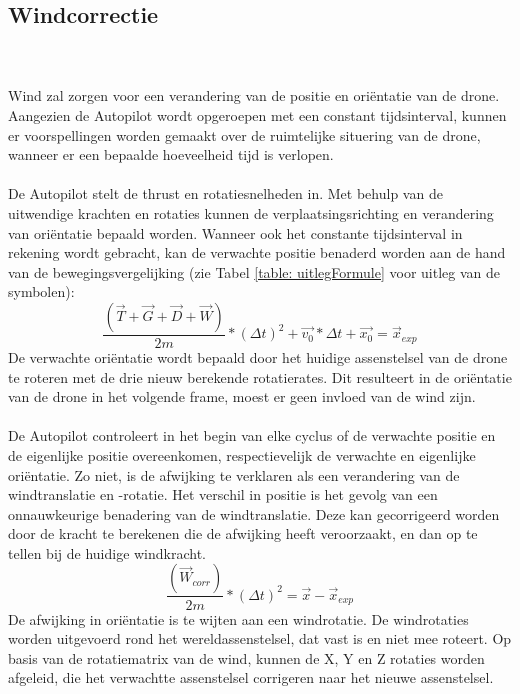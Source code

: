 \subsection{Windcorrectie}
\\
\\
Wind zal zorgen voor een verandering van de positie en ori\"entatie van de drone.  Aangezien de Autopilot wordt opgeroepen met een constant tijdsinterval, kunnen er voorspellingen worden gemaakt over de ruimtelijke situering van de drone, wanneer er een bepaalde hoeveelheid tijd is verlopen.
\\\\
De Autopilot stelt de thrust en rotatiesnelheden in. Met behulp van de uitwendige krachten en rotaties kunnen de verplaatsingsrichting en verandering van ori\"entatie bepaald worden. Wanneer ook het constante tijdsinterval in rekening wordt gebracht, kan de verwachte positie benaderd worden aan de hand van de bewegingsvergelijking (zie Tabel \ref{table: uitlegFormule} voor uitleg van de symbolen):
\begin{equation}
	 \frac{(\vec{T} + \vec{G} + \vec{D} + \vec{W}) }{2m} * (\Delta t)^2 + \vec{v_0} * \Delta t + \vec{x_0} = \vec{x}_{exp}
\end{equation}
De verwachte ori\"entatie wordt bepaald door het huidige assenstelsel van de drone te roteren met de drie nieuw berekende rotatierates. Dit resulteert in de ori\"entatie van de drone in het volgende frame, moest er geen invloed van de wind zijn.
\\
\\
De Autopilot controleert in het begin van elke cyclus of de verwachte positie en de eigenlijke positie overeenkomen, respectievelijk de verwachte en eigenlijke ori\"entatie. Zo niet, is de afwijking te verklaren als een verandering van de windtranslatie en -rotatie. Het verschil in positie is het gevolg van een onnauwkeurige benadering van de windtranslatie. Deze kan gecorrigeerd worden door de kracht te berekenen die de afwijking heeft veroorzaakt, en dan op te tellen bij de huidige windkracht.
\begin{equation}
	\frac{(\vec{W}_{corr}) }{2m} * (\Delta t)^2 = \vec{x}-\vec{x}_{exp}
\end{equation}
De afwijking in ori\"entatie is te wijten aan een windrotatie. De windrotaties worden uitgevoerd rond het wereldassenstelsel, dat vast is en niet mee roteert. Op basis van de rotatiematrix van de wind, kunnen de X, Y en Z rotaties worden afgeleid, die het verwachtte assenstelsel corrigeren naar het nieuwe assenstelsel. 
